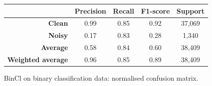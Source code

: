 \documentclass[a4paper,10pt]{article}
\begin{document}
\begin{figure}[p]
{\begin{minipage}{0.6\textwidth}
			\caption{BinCl on binary classification data: normalised confusion matrix.}%
			\label{fig:bincl_umc_cm}
		\end{minipage}
	}
	\baselineskip
	\begin{tabular}{r|c|c|c|c}
		                          & \textbf{Precision} & \textbf{Recall} & \textbf{F1-score} & \textbf{Support} \\ \midrule
		\textbf{Clean}            & 0.99               & 0.85            & 0.92              & 37,069           \\
		\textbf{Noisy}            & 0.17               & 0.83            & 0.28              & 1,340            \\ \midrule
		\textbf{Average}          & 0.58               & 0.84            & 0.60              & 38,409           \\
		\textbf{Weighted average} & 0.96               & 0.85            & 0.89              & 38,409
	\end{tabular}
	\label{tab:bincl_umc_cr}
\end{figure}
\end{document}
